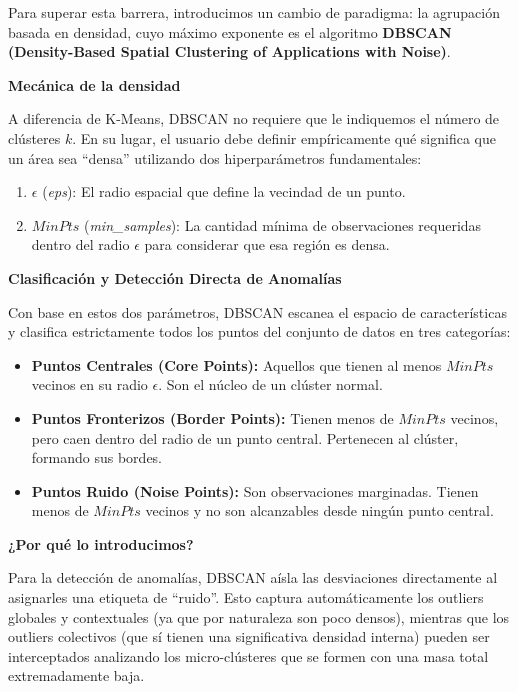 Para superar esta barrera, introducimos un cambio de paradigma: la agrupación basada en densidad, cuyo máximo exponente es el algoritmo \textbf{DBSCAN (Density-Based Spatial Clustering of Applications with Noise)}.

\textbf{Mecánica de la densidad}

A diferencia de K-Means, DBSCAN no requiere que le indiquemos el número de clústeres $k$. En su lugar, el usuario debe definir empíricamente qué significa que un área sea ``densa'' utilizando dos hiperparámetros fundamentales:

\begin{enumerate}
	\item $\epsilon$ (\textit{eps}): El radio espacial que define la vecindad de un punto.
	
	\item $MinPts$ (\textit{min\_samples}): La cantidad mínima de observaciones requeridas dentro del radio $\epsilon$ para considerar que esa región es densa.
\end{enumerate}

\textbf{Clasificación y Detección Directa de Anomalías}

Con base en estos dos parámetros, DBSCAN escanea el espacio de características y clasifica estrictamente todos los puntos del conjunto de datos en tres categorías:

\begin{itemize}
	
	\item \textbf{Puntos Centrales (Core Points):} Aquellos que tienen al menos $MinPts$ vecinos en su radio $\epsilon$. Son el núcleo de un clúster normal.
	
	\item \textbf{Puntos Fronterizos (Border Points):} Tienen menos de $MinPts$ vecinos, pero caen dentro del radio de un punto central. Pertenecen al clúster, formando sus bordes.
	
	\item \textbf{Puntos Ruido (Noise Points):} Son observaciones marginadas. Tienen menos de $MinPts$ vecinos y no son alcanzables desde ningún punto central.
	
\end{itemize}

\textbf{¿Por qué lo introducimos?}

Para la detección de anomalías, DBSCAN aísla las desviaciones directamente al asignarles una etiqueta de ``ruido''. Esto captura automáticamente los outliers globales y contextuales (ya que por naturaleza son poco densos), mientras que los outliers colectivos (que sí tienen una significativa densidad interna) pueden ser interceptados analizando los micro-clústeres que se formen con una masa total extremadamente baja.

